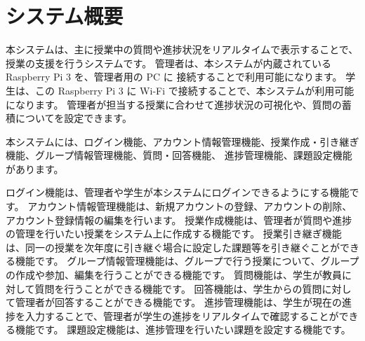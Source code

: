 \section{システム概要}
本システムは、主に授業中の質問や進捗状況をリアルタイムで表示することで、 授業の支援を行うシステムです。
管理者は、本システムが内蔵されている Raspberry Pi 3 を、管理者用の PC に 接続することで利用可能になります。
学生は、この Raspberry Pi 3 に Wi-Fi で接続することで、本システムが利用可能になります。
管理者が担当する授業に合わせて進捗状況の可視化や、質問の蓄積についてを設定できます。

本システムには、ログイン機能、アカウント情報管理機能、授業作成・引き継ぎ機能、グループ情報管理機能、質問・回答機能、
進捗管理機能、課題設定機能があります。

ログイン機能は、管理者や学生が本システムにログインできるようにする機能です。
アカウント情報管理機能は、新規アカウントの登録、アカウントの削除、アカウント登録情報の編集を行います。
授業作成機能は、管理者が質問や進捗の管理を行いたい授業をシステム上に作成する機能です。
授業引き継ぎ機能は、同一の授業を次年度に引き継ぐ場合に設定した課題等を引き継ぐことができる機能です。
グループ情報管理機能は、グループで行う授業について、グループの作成や参加、編集を行うことができる機能です。
質問機能は、学生が教員に対して質問を行うことができる機能です。
回答機能は、学生からの質問に対して管理者が回答することができる機能です。
進捗管理機能は、学生が現在の進捗を入力することで、管理者が学生の進捗をリアルタイムで確認することができる機能です。
課題設定機能は、進捗管理を行いたい課題を設定する機能です。








